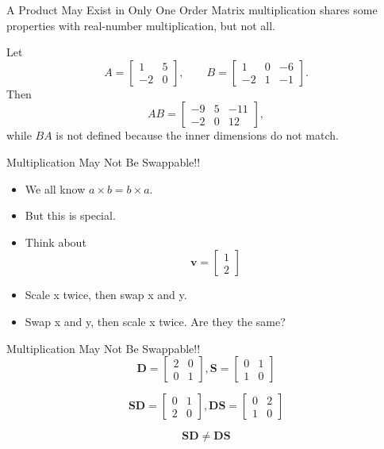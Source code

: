 \begin{frame}{A Product May Exist in Only One Order}
Matrix multiplication shares some properties with real-number multiplication, but not all.
\medskip

Let
\[
A=\begin{bmatrix}1&5\\-2&0\end{bmatrix},\qquad
B=\begin{bmatrix}1&0&-6\\-2&1&-1\end{bmatrix}.
\]
Then
\[
AB=\begin{bmatrix}-9&5&-11\\-2&0&12\end{bmatrix},
\]
while $BA$ is not defined because the inner dimensions do not match.
\end{frame}

\begin{frame}{Multiplication May Not Be Swappable!!}
  \begin{itemize}
    \item We all know $a \times b = b \times a$.
    \item But this is special. \pause
    \item Think about \[\mathbf{v}=
    \begin{bmatrix}1\\2\end{bmatrix}
    \]
    \item Scale x twice, then swap x and y.
    \item Swap x and y, then scale x twice. Are they the same?
  \end{itemize}
  
\end{frame}


\begin{frame}{Multiplication May Not Be Swappable!!}
  \pause
  \[\mathbf{D}=\begin{bmatrix}2&0\\0&1\end{bmatrix}, \mathbf{S}=\begin{bmatrix}0&1\\1&0\end{bmatrix}\]\pause

  \[\mathbf{SD}=\begin{bmatrix}0&1\\2&0\end{bmatrix}, \mathbf{DS}=\begin{bmatrix}0&2\\1&0\end{bmatrix}\]\pause

  \[\mathbf{SD} \neq \mathbf{DS}\]
\end{frame}

